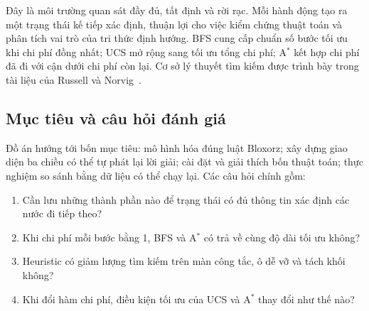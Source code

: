 \documentclass[a4paper]{article}
\newcommand{\astar}{\texorpdfstring{A\ensuremath{^*}}{A*}}
\begin{document}
Đây là môi trường quan sát đầy đủ, tất định và rời rạc. Mỗi hành động tạo ra một trạng thái kế tiếp xác định, thuận lợi cho việc kiểm chứng thuật toán và phân tích vai trò của tri thức định hướng. BFS cung cấp chuẩn số bước tối ưu khi chi phí đồng nhất; UCS mở rộng sang tối ưu tổng chi phí; \astar{} kết hợp chi phí đã đi với cận dưới chi phí còn lại. Cơ sở lý thuyết tìm kiếm được trình bày trong tài liệu của Russell và Norvig~\cite{aima}.

\subsection{Mục tiêu và câu hỏi đánh giá}
Đồ án hướng tới bốn mục tiêu: mô hình hóa đúng luật Bloxorz; xây dựng giao diện ba chiều có thể tự phát lại lời giải; cài đặt và giải thích bốn thuật toán; thực nghiệm so sánh bằng dữ liệu có thể chạy lại. Các câu hỏi chính gồm:
\begin{enumerate}
\item Cần lưu những thành phần nào để trạng thái có đủ thông tin xác định các nước đi tiếp theo?
\item Khi chi phí mỗi bước bằng 1, BFS và \astar{} có trả về cùng độ dài tối ưu không?
\item Heuristic có giảm lượng tìm kiếm trên màn công tắc, ô dễ vỡ và tách khối không?
\item Khi đổi hàm chi phí, điều kiện tối ưu của UCS và \astar{} thay đổi như thế nào?
\end{enumerate}
\end{document}
